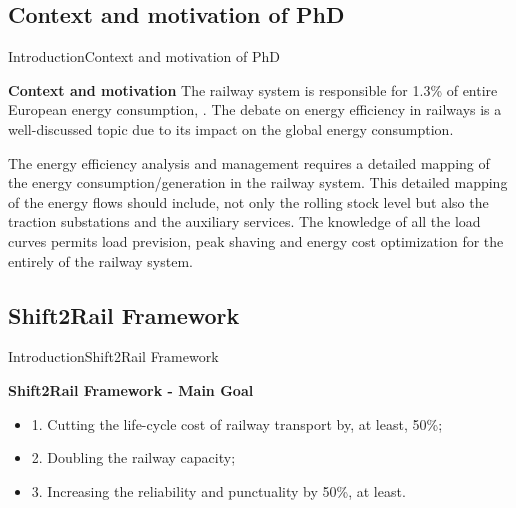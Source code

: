 \subsection{Context and motivation of PhD}
\begin{frame}{Introduction}{Context and motivation of PhD}
	\begin{block}{\textbf{Context and motivation}}
		The railway system is responsible for 1.3\% of entire European energy consumption, \cite{iea-uic2016}. 
		The debate on energy efficiency in railways is a well-discussed topic due to its impact on the global energy consumption.
		
		The energy efficiency analysis and management requires a detailed mapping of the energy consumption/generation in the railway system. 
		This detailed mapping of the energy flows should include, not only the rolling stock level but also the traction substations and the auxiliary services.
		The knowledge of all the load curves permits load prevision, peak shaving and energy cost optimization for the entirely of the railway system.
		
	\end{block}
\end{frame}

\subsection{Shift2Rail Framework}
\begin{frame}{Introduction}{Shift2Rail Framework}
\begin{block}{\textbf{Shift2Rail Framework - Main Goal}}
	\begin{itemize}
		\item 1. Cutting the life-cycle cost of railway transport by, at least, 50\%;
		\item 2. Doubling the railway capacity;
		\item 3. Increasing the reliability and punctuality by 50\%, at least.
	\end{itemize}
	
\end{block}
\end{frame}

